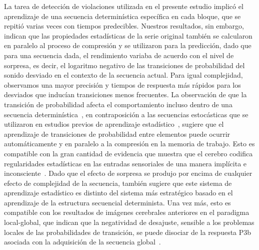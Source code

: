 La tarea de detección de violaciones utilizada en el presente estudio implicó el aprendizaje de una secuencia determinística específica en cada bloque, que se repitió varias veces con tiempos predecibles. Nuestros resultados, sin embargo, indican que las propiedades estadísticas de la serie original también se calcularon en paralelo al proceso de compresión y se utilizaron para la predicción, dado que para una secuencia dada, el rendimiento variaba de acuerdo con el nivel de sorpresa, es decir, el logaritmo negativo de las transiciones de probabilidad del sonido desviado en el contexto de la secuencia actual. Para igual complejidad, observamos una mayor precisión y tiempos de respuesta más rápidos para los desviados que inducían transiciones menos frecuentes. La observación de que la transición de probabilidad afecta el comportamiento incluso dentro de una secuencia determinística~\cite{f80}, en contraposición a las secuencias estocásticas que se utilizaron en estudios previos de aprendizaje estadístico~\cite{f18,f19,f20,f74,f75,f122}, sugiere que el aprendizaje de transiciones de probabilidad entre elementos puede ocurrir automáticamente y en paralelo a la compresión en la memoria de trabajo. Esto es compatible con la gran cantidad de evidencia que muestra que el cerebro codifica regularidades estadísticas en las entradas sensoriales de una manera implícita e inconsciente~\cite{f73,f123,f124,f125,f126}. Dado que el efecto de sorpresa se produjo por encima de cualquier efecto de complejidad de la secuencia, también sugiere que este sistema de aprendizaje estadístico es distinto del sistema más estratégico basado en el aprendizaje de la estructura secuencial determinista. Una vez más, esto es compatible con los resultados de imágenes cerebrales anteriores en el paradigma local-global, que indican que la negatividad de desajuste, sensible a los problemas locales de las probabilidades de transición, se puede disociar de la respuesta P3b asociada con la adquisición de la secuencia global~\cite{p67,p68,p72}.


